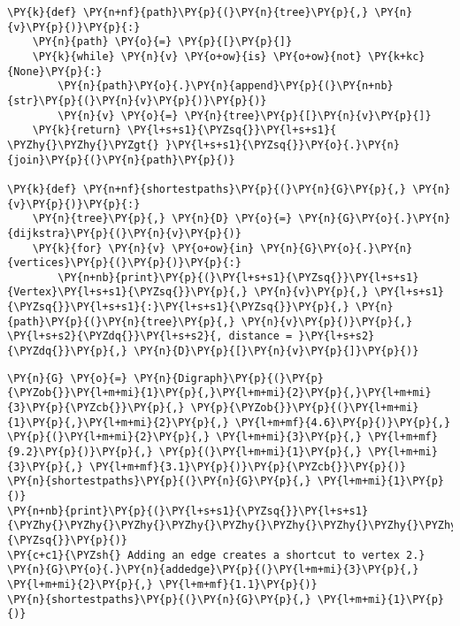 \begin{Verbatim}[commandchars=\\\{\}]
\PY{k}{def} \PY{n+nf}{path}\PY{p}{(}\PY{n}{tree}\PY{p}{,} \PY{n}{v}\PY{p}{)}\PY{p}{:}
    \PY{n}{path} \PY{o}{=} \PY{p}{[}\PY{p}{]}
    \PY{k}{while} \PY{n}{v} \PY{o+ow}{is} \PY{o+ow}{not} \PY{k+kc}{None}\PY{p}{:}
        \PY{n}{path}\PY{o}{.}\PY{n}{append}\PY{p}{(}\PY{n+nb}{str}\PY{p}{(}\PY{n}{v}\PY{p}{)}\PY{p}{)}
        \PY{n}{v} \PY{o}{=} \PY{n}{tree}\PY{p}{[}\PY{n}{v}\PY{p}{]}
    \PY{k}{return} \PY{l+s+s1}{\PYZsq{}}\PY{l+s+s1}{ \PYZhy{}\PYZhy{}\PYZgt{} }\PY{l+s+s1}{\PYZsq{}}\PY{o}{.}\PY{n}{join}\PY{p}{(}\PY{n}{path}\PY{p}{)}

\PY{k}{def} \PY{n+nf}{shortestpaths}\PY{p}{(}\PY{n}{G}\PY{p}{,} \PY{n}{v}\PY{p}{)}\PY{p}{:}
    \PY{n}{tree}\PY{p}{,} \PY{n}{D} \PY{o}{=} \PY{n}{G}\PY{o}{.}\PY{n}{dijkstra}\PY{p}{(}\PY{n}{v}\PY{p}{)}
    \PY{k}{for} \PY{n}{v} \PY{o+ow}{in} \PY{n}{G}\PY{o}{.}\PY{n}{vertices}\PY{p}{(}\PY{p}{)}\PY{p}{:}
        \PY{n+nb}{print}\PY{p}{(}\PY{l+s+s1}{\PYZsq{}}\PY{l+s+s1}{Vertex}\PY{l+s+s1}{\PYZsq{}}\PY{p}{,} \PY{n}{v}\PY{p}{,} \PY{l+s+s1}{\PYZsq{}}\PY{l+s+s1}{:}\PY{l+s+s1}{\PYZsq{}}\PY{p}{,} \PY{n}{path}\PY{p}{(}\PY{n}{tree}\PY{p}{,} \PY{n}{v}\PY{p}{)}\PY{p}{,} \PY{l+s+s2}{\PYZdq{}}\PY{l+s+s2}{, distance = }\PY{l+s+s2}{\PYZdq{}}\PY{p}{,} \PY{n}{D}\PY{p}{[}\PY{n}{v}\PY{p}{]}\PY{p}{)}
\end{Verbatim}


\begin{Verbatim}[commandchars=\\\{\}]
\PY{n}{G} \PY{o}{=} \PY{n}{Digraph}\PY{p}{(}\PY{p}{\PYZob{}}\PY{l+m+mi}{1}\PY{p}{,}\PY{l+m+mi}{2}\PY{p}{,}\PY{l+m+mi}{3}\PY{p}{\PYZcb{}}\PY{p}{,} \PY{p}{\PYZob{}}\PY{p}{(}\PY{l+m+mi}{1}\PY{p}{,}\PY{l+m+mi}{2}\PY{p}{,} \PY{l+m+mf}{4.6}\PY{p}{)}\PY{p}{,} \PY{p}{(}\PY{l+m+mi}{2}\PY{p}{,} \PY{l+m+mi}{3}\PY{p}{,} \PY{l+m+mf}{9.2}\PY{p}{)}\PY{p}{,} \PY{p}{(}\PY{l+m+mi}{1}\PY{p}{,} \PY{l+m+mi}{3}\PY{p}{,} \PY{l+m+mf}{3.1}\PY{p}{)}\PY{p}{\PYZcb{}}\PY{p}{)}
\PY{n}{shortestpaths}\PY{p}{(}\PY{n}{G}\PY{p}{,} \PY{l+m+mi}{1}\PY{p}{)}
\PY{n+nb}{print}\PY{p}{(}\PY{l+s+s1}{\PYZsq{}}\PY{l+s+s1}{\PYZhy{}\PYZhy{}\PYZhy{}\PYZhy{}\PYZhy{}\PYZhy{}\PYZhy{}\PYZhy{}\PYZhy{}\PYZhy{}\PYZhy{}\PYZhy{}\PYZhy{}\PYZhy{}\PYZhy{}\PYZhy{}\PYZhy{}\PYZhy{}\PYZhy{}\PYZhy{}\PYZhy{}\PYZhy{}\PYZhy{}\PYZhy{}}\PY{l+s+s1}{\PYZsq{}}\PY{p}{)}
\PY{c+c1}{\PYZsh{} Adding an edge creates a shortcut to vertex 2.}
\PY{n}{G}\PY{o}{.}\PY{n}{addedge}\PY{p}{(}\PY{l+m+mi}{3}\PY{p}{,} \PY{l+m+mi}{2}\PY{p}{,} \PY{l+m+mf}{1.1}\PY{p}{)}
\PY{n}{shortestpaths}\PY{p}{(}\PY{n}{G}\PY{p}{,} \PY{l+m+mi}{1}\PY{p}{)}
\end{Verbatim}


